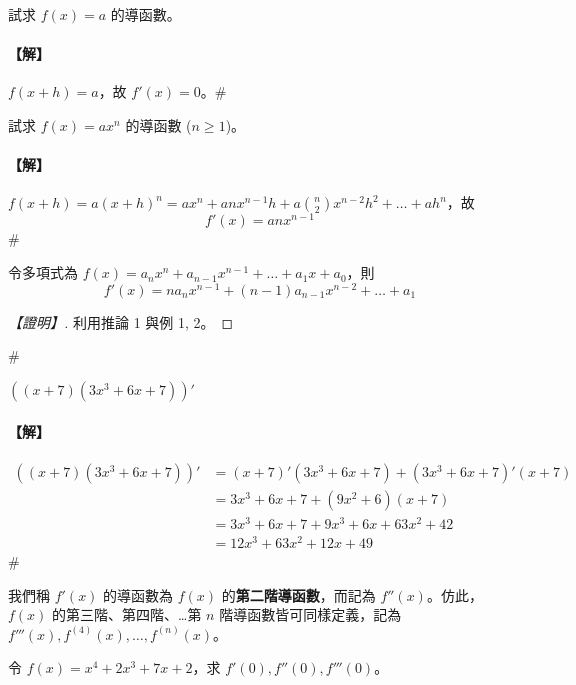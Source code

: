 \begin{example}\label{ex:b6-2-14}
試求 $f(x)=a$ 的導函數。
\end{example}

\paragraph{【解】}
$f(x+h)=a$，故 $f'(x)=0$。\hfill$\#$

\begin{example}\label{ex:b6-2-15}
試求 $f(x)=ax^n$ 的導函數 ($n \ge 1$)。
\end{example}

\paragraph{【解】}
$f(x+h) = a(x+h)^n = ax^n + anx^{n-1}h + a\binom{n}{2}x^{n-2}h^2 + \dots + ah^n$，故
\[ f'(x) = anx^{n-1} \]\hfill$\#$

\begin{corollary}\label{cor:b6-2-poly-diff}
令多項式為 $f(x) = a_n x^n + a_{n-1} x^{n-1} + \dots + a_1 x + a_0$，則
\[ f'(x) = n a_n x^{n-1} + (n-1)a_{n-1} x^{n-2} + \dots + a_1 \]
\end{corollary}

\begin{proof}[【證明】]
利用推論 1 與例 1, 2。
\end{proof}\hfill$\#$

\begin{example}\label{ex:b6-2-16}
$((x+7)(3x^3+6x+7))'$
\end{example}

\paragraph{【解】}
\begin{align*}
((x+7)(3x^3+6x+7))' &= (x+7)'(3x^3+6x+7) + (3x^3+6x+7)'(x+7) \\
&= 3x^3+6x+7 + (9x^2+6)(x+7) \\
&= 3x^3+6x+7 + 9x^3+6x+63x^2+42 \\
&= 12x^3+63x^2+12x+49
\end{align*}
\hfill$\#$

我們稱 $f'(x)$ 的導函數為 $f(x)$ 的\textbf{第二階導函數}，而記為 $f''(x)$。仿此，$f(x)$ 的第三階、第四階、\dots 第 $n$ 階導函數皆可同樣定義，記為 $f'''(x), f^{(4)}(x), \dots, f^{(n)}(x)$。

\begin{example}\label{ex:b6-2-17}
令 $f(x)=x^4+2x^3+7x+2$，求 $f'(0), f''(0), f'''(0)$。
\end{example}

